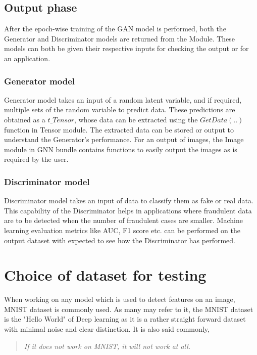 \documentclass[conference]{IEEEtran}
\begin{document}
\subsection{Output phase}

After the epoch-wise training of the GAN model is performed, both the Generator and Discriminator models are returned from the Module. These models can both be given their respective inputs for checking the output or for an application. 

\subsubsection{\textbf{Generator model}}

Generator model takes an input of a random latent variable, and if required, multiple sets of the random variable to predict data. These predictions are obtained as a $t\_Tensor$, whose data can be extracted using the $GetData(..)$ function in Tensor module. The extracted data can be stored or output to understand the Generator's performance. For an output of images, the Image module in GNN bundle contains functions to easily output the images as is required by the user. 

\subsubsection{\textbf{Discriminator model}}

Discriminator model takes an input of data to classify them as fake or real data. This capability of the Discriminator helps in applications where fraudulent data are to be detected when the number of fraudulent cases are smaller. Machine learning evaluation metrics like AUC, F1 score etc. can be performed on the output dataset with expected to see how the Discriminator has performed.

\section{Choice of dataset for testing}

When working on any model which is used to detect features on an image, MNIST dataset is commonly used. As many may refer to it, the MNIST dataset is the "Hello World" of Deep learning as it is a rather straight forward dataset with minimal noise and clear distinction. It is also said commonly, \begin{quote}
    \textit{If it does not work on MNIST, it will not work at all.}
\end{quote}
\end{document}
